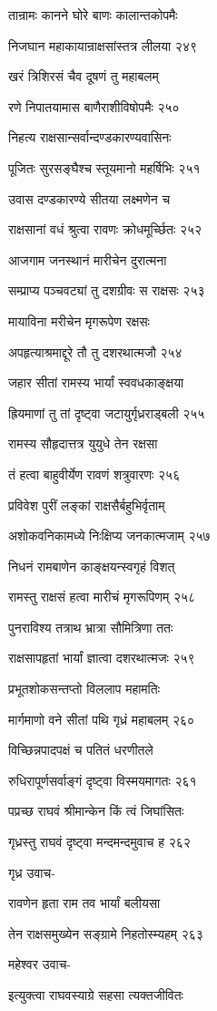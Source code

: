 तान्रामः कानने घोरे बाणः कालान्तकोपमैः

निजघान महाकायान्राक्षसांस्तत्र लीलया २४९

खरं त्रिशिरसं चैव दूषणं तु महाबलम्

रणे निपातयामास बाणैराशीविषोपमैः २५०

निहत्य राक्षसान्सर्वान्दण्डकारण्यवासिनः

पूजितः सुरसङ्घैश्च स्तूयमानो महर्षिभिः २५१

उवास दण्डकारण्ये सीतया लक्ष्मणेन च

राक्षसानां वधं श्रुत्वा रावणः क्रोधमूर्च्छितः २५२

आजगाम जनस्थानं मारीचेन दुरात्मना

सम्प्राप्य पञ्चवट्यां तु दशग्रीवः स राक्षसः २५३

मायाविना मरीचेन मृगरूपेण रक्षसः

अपहृत्याश्रमाद्दूरे तौ तु दशरथात्मजौ २५४

जहार सीतां रामस्य भार्यां स्ववधकाङ्क्षया

ह्रियमाणां तु तां दृष्ट्वा जटायुर्गृध्रराड्बली २५५

रामस्य सौहृदात्तत्र युयुधे तेन रक्षसा

तं हत्वा बाहुवीर्येण रावणं शत्रुवारणः २५६

प्रविवेश पुरीं लङ्कां राक्षसैर्बहुभिर्वृताम्

अशोकवनिकामध्ये निःक्षिप्य जनकात्मजाम् २५७

निधनं रामबाणेन काङ्क्षयन्स्वगृहं विशत्

रामस्तु राक्षसं हत्वा मारीचं मृगरूपिणम् २५८

पुनराविश्य तत्राथ भ्रात्रा सौमित्रिणा ततः

राक्षसापहृतां भार्यां ज्ञात्वा दशरथात्मजः २५९

प्रभूतशोकसन्तप्तो विललाप महामतिः

मार्गमाणो वने सीतां पथि गृध्रं महाबलम् २६०

विच्छिन्नपादपक्षं च पतितं धरणीतले

रुधिरापूर्णसर्वाङ्गं दृष्ट्वा विस्मयमागतः २६१

पप्रच्छ राघवं श्रीमान्केन किं त्वं जिघांसितः

गृध्रस्तु राघवं दृष्ट्वा मन्दमन्दमुवाच ह २६२

गृध्र उवाच-

रावणेन हृता राम तव भार्यां बलीयसा

तेन राक्षसमुख्येन सङ्ग्रामे निहतोस्म्यहम् २६३

महेश्वर उवाच-

इत्युक्त्वा राघवस्याग्रे सहसा त्यक्तजीवितः

